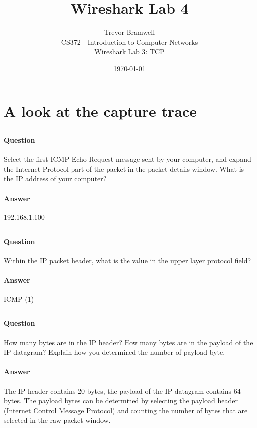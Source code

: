 \documentclass[12pt,letterpaper]{article}
\title{Wireshark Lab 4}
\author{
    Trevor Bramwell \\
    CS372 - Introduction to Computer Networks \\
    Wireshark Lab 3: TCP
}
\date{\today}
\begin{document}
\maketitle

\setcounter{section}{1}
\section{A look at the capture trace}

\label{1}
\subsection{}
\paragraph{Question} Select the first ICMP Echo Request message sent by your
computer, and expand the Internet Protocol part of the packet in the packet
details window. What is the IP address of your computer?
\paragraph{Answer} 192.168.1.100



\label{2}
\subsection{}
\paragraph{Question} Within the IP packet header, what is the value in the
upper layer protocol field?
\paragraph{Answer} ICMP (1)

\label{3}
\subsection{}
\paragraph{Question} How many bytes are in the IP header? 
How many bytes are in the payload of the IP datagram?
Explain how you determined the number of payload byte.
\paragraph{Answer} The IP header contains 20 bytes, the payload of the IP
datagram contains 64 bytes.
The payload bytes can be determined by selecting the payload
header (Internet Control Message Protocol) and counting the number of bytes
that are selected in the raw packet window.
\end{document}
